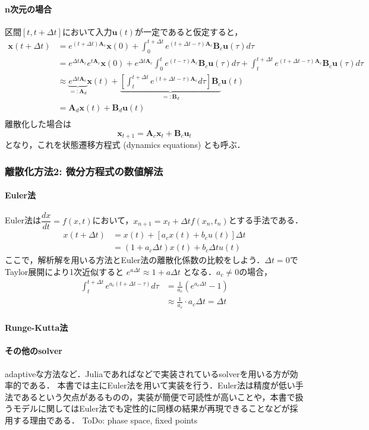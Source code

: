 \paragraph{n次元の場合}
区間$[t, t+\Delta t]$において入力$\mathbf{u}(t)$が一定であると仮定すると，
\begin{align}
\mathbf{x}(t+\Delta t)&=e^{(t+\Delta t)\mathbf{A}_c}\mathbf{x}(0)+\int_0^{t+\Delta t} e^{(t+\Delta t-\tau)\mathbf{A}_c}\mathbf{B}_c\mathbf{u}(\tau) d\tau\\
&=e^{\Delta t\mathbf{A}_c}e^{t\mathbf{A}_c}\mathbf{x}(0)+e^{\Delta t\mathbf{A}_c}\int_0^{t} e^{(t-\tau)\mathbf{A}_c}\mathbf{B}_c\mathbf{u}(\tau) d\tau + \int_t^{t+\Delta t} e^{(t+\Delta t-\tau)\mathbf{A}_c}\mathbf{B}_c\mathbf{u}(\tau) d\tau\\
&\approx \underbrace{e^{\Delta t\mathbf{A}_c}}_{=: \mathbf{A}_d}\mathbf{x}(t)+\underbrace{\left[\int_t^{t+\Delta t} e^{(t+\Delta t-\tau)\mathbf{A}_c} d\tau\right] \mathbf{B}_c}_{=: \mathbf{B}_d}\mathbf{u}(t)\\
&=\mathbf{A}_d\mathbf{x}(t)+\mathbf{B}_d\mathbf{u}(t)\\
\end{align}
離散化した場合は
\begin{equation}
\mathbf{x}_{t+1} = \mathbf{A}_c\mathbf{x}_t + \mathbf{B}_c\mathbf{u}_t
\end{equation}
となり，これを状態遷移方程式 (dynamics equations) とも呼ぶ．
\subsubsection{離散化方法2: 微分方程式の数値解法}
\paragraph{Euler法}
Euler法は$\dfrac{dx}{dt}=f(x, t)$において，$x_{n+1}=x_t+\Delta t f(x_n, t_n)$とする手法である．
\begin{align}
x(t+\Delta t)&=x(t) + \left[a_c x(t)+b_c u(t) \right]\Delta t\\
&=(1+a_c \Delta t)x(t) + b_c\Delta t u(t)
\end{align}
ここで，解析解を用いる方法とEuler法の離散化係数の比較をしよう．$\Delta t=0$でTaylor展開により1次近似すると $e^{a \Delta t} \approx 1 + a\Delta t$ となる．$a_c\neq 0$の場合，
\begin{align}
\int_t^{t+\Delta t} e^{a_c(t+\Delta t-\tau)} d\tau&=\frac{1}{a_c}(e^{a_c \Delta t}-1)\\
&\approx \frac{1}{a_c}\cdot a_c \Delta t=\Delta t
\end{align}
\paragraph{Runge-Kutta法}
\paragraph{その他のsolver}
adaptiveな方法など．Juliaであればなどで実装されているsolverを用いる方が効率的である．
本書では主にEuler法を用いて実装を行う．Euler法は精度が低い手法であるという欠点があるものの，実装が簡便で可読性が高いことや，本書で扱うモデルに関してはEuler法でも定性的に同様の結果が再現できることなどが採用する理由である．
ToDo: phase space, fixed points
